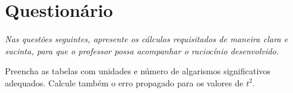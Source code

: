 \cleardoublepage


\vspace{15mm}

\begin{fullwidth}
\noindent{}
\vspace{5mm}

\noindent{}

\noindent{}

\noindent{}

\noindent{}

\noindent{}
\end{fullwidth}

\vspace{5mm}

\section{Questionário}
\emph{Nas questões seguintes, apresente os cálculos requisitados de maneira clara e sucinta, para que o professor possa acompanhar o raciocínio desenvolvido.}
\vspace{5mm}

\begin{question}[type={exam}]{2}
Preencha as tabelas com unidades e número de algarismos significativos adequados. Calcule também o erro propagado para os valores de $t^2$.
\end{question}

